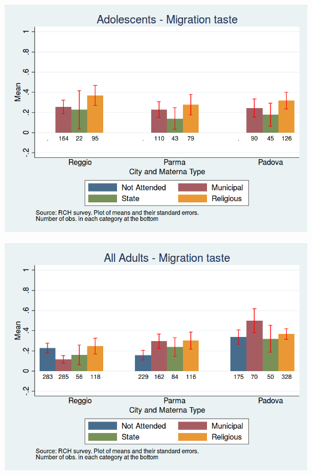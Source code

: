 \documentclass{beamer}
\begin{document}
\begin{frame}
\center
\includegraphics[scale=0.40]{../Output/MigrTaste_cat_Ado.png}
\end{frame}

\begin{frame}
\center
\includegraphics[scale=0.40]{../Output/MigrTaste_cat_AllAdults.png}
\end{frame}


\end{document}
